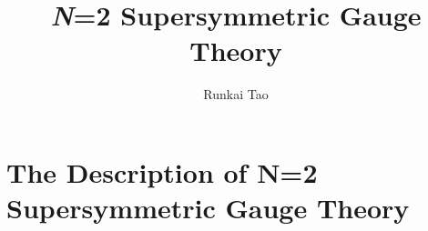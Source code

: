\documentclass{fduthesis-en}
\title{\textit{N}=2 Supersymmetric Gauge Theory}
\author{Runkai Tao}
\begin{document}
\maketitle
\tableofcontents

	
\chapter{The Description of N=2 Supersymmetric Gauge Theory}
\cite{Yuji2013N}

\printbibliography
\end{document}
